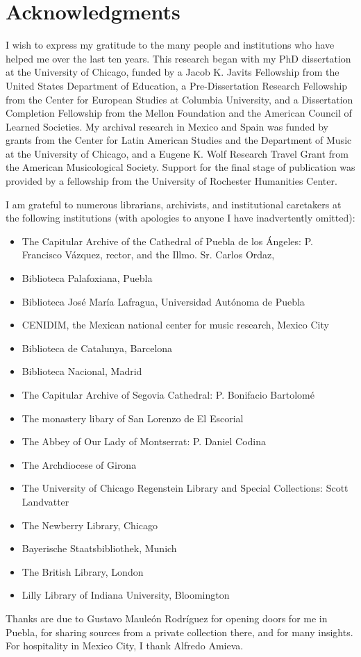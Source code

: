 \chapter{Acknowledgments}
\label{ch:thanks}

I wish to express my gratitude to the many people and institutions who have
helped me over the last ten years.
This research began with my PhD dissertation at the University of Chicago,
funded by a Jacob K. Javits Fellowship from the United States Department of
Education, a Pre-Dissertation Research Fellowship from the Center for European
Studies at Columbia University, and a Dissertation Completion Fellowship from
the Mellon Foundation and the American Council of Learned Societies.
My archival research in Mexico and Spain was funded by grants from the Center
for Latin American Studies and the Department of Music at the University of
Chicago, and a Eugene K. Wolf Research Travel Grant from the American
Musicological Society.
Support for the final stage of publication was provided by a fellowship from
the University of Rochester Humanities Center.

I am grateful to numerous librarians, archivists, and institutional
caretakers at the following institutions (with apologies to anyone I have
inadvertently omitted):
\begin{itemize}
    \item The Capitular Archive of the Cathedral of Puebla de los Ángeles:
        P. Francisco Vázquez, rector, and the Illmo. Sr. Carlos
        Ordaz, 
    \item Biblioteca Palafoxiana, Puebla
    \item Biblioteca José María Lafragua, Universidad Autónoma de Puebla
    \item CENIDIM, the Mexican national center for music research, Mexico
        City
    \item Biblioteca de Catalunya, Barcelona
    \item Biblioteca Nacional, Madrid
    \item The Capitular Archive of Segovia Cathedral: P. Bonifacio Bartolomé
    \item The monastery libary of San Lorenzo de El Escorial
    \item The Abbey of Our Lady of Montserrat: P. Daniel Codina
    \item The Archdiocese of Girona
    \item The University of Chicago Regenstein Library and Special
        Collections: Scott Landvatter
    \item The Newberry Library, Chicago
    \item Bayerische Staatsbibliothek, Munich
    \item The British Library, London
    \item Lilly Library of Indiana University, Bloomington
\end{itemize}
Thanks are due to Gustavo Mauleón Rodríguez for opening doors for me in
Puebla, for sharing sources from a private collection there, and for many
insights.
For hospitality in Mexico City, I thank Alfredo Amieva.

